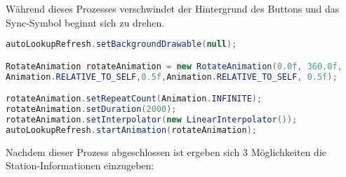 Während dieses Prozesses verschwindet der Hintergrund des Buttons und das Sync-Symbol beginnt sich zu drehen.

\begin{lstlisting}[language=java, captionpos=b, caption={Rotationanimation des Buttons}]
autoLookupRefresh.setBackgroundDrawable(null);

RotateAnimation rotateAnimation = new RotateAnimation(0.0f, 360.0f,
Animation.RELATIVE_TO_SELF,0.5f,Animation.RELATIVE_TO_SELF, 0.5f);

rotateAnimation.setRepeatCount(Animation.INFINITE);
rotateAnimation.setDuration(2000);
rotateAnimation.setInterpolator(new LinearInterpolator());
autoLookupRefresh.startAnimation(rotateAnimation);
\end{lstlisting}



Nachdem dieser Prozess abgeschlossen ist ergeben sich 3 Möglichkeiten die Station-Informationen einzugeben:

